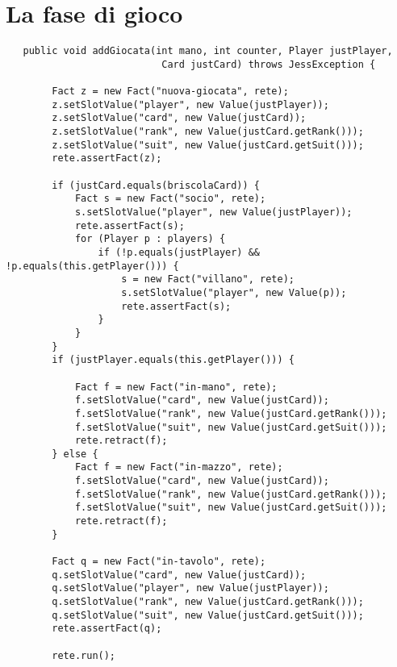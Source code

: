 \section{La fase di gioco}


\lstset{numbers=left, numberstyle=\tiny, stepnumber=1,firstnumber=1,
  numbersep=5pt,language=Java,
stringstyle=\ttfamily,
basicstyle=\footnotesize, 
showstringspaces=false,
breaklines=true
}

\begin{lstlisting}
   public void addGiocata(int mano, int counter, Player justPlayer,
                           Card justCard) throws JessException {

        Fact z = new Fact("nuova-giocata", rete);
        z.setSlotValue("player", new Value(justPlayer));
        z.setSlotValue("card", new Value(justCard));
        z.setSlotValue("rank", new Value(justCard.getRank()));
        z.setSlotValue("suit", new Value(justCard.getSuit()));
        rete.assertFact(z);

        if (justCard.equals(briscolaCard)) {
            Fact s = new Fact("socio", rete);
            s.setSlotValue("player", new Value(justPlayer));
            rete.assertFact(s);
            for (Player p : players) {
                if (!p.equals(justPlayer) && !p.equals(this.getPlayer())) {
                    s = new Fact("villano", rete);
                    s.setSlotValue("player", new Value(p));
                    rete.assertFact(s);
                }
            }
        }
        if (justPlayer.equals(this.getPlayer())) {
        
            Fact f = new Fact("in-mano", rete);
            f.setSlotValue("card", new Value(justCard));
            f.setSlotValue("rank", new Value(justCard.getRank()));
            f.setSlotValue("suit", new Value(justCard.getSuit()));
            rete.retract(f);
        } else {
            Fact f = new Fact("in-mazzo", rete);
            f.setSlotValue("card", new Value(justCard));
            f.setSlotValue("rank", new Value(justCard.getRank()));
            f.setSlotValue("suit", new Value(justCard.getSuit()));
            rete.retract(f);
        }

        Fact q = new Fact("in-tavolo", rete);
        q.setSlotValue("card", new Value(justCard));
        q.setSlotValue("player", new Value(justPlayer));
        q.setSlotValue("rank", new Value(justCard.getRank()));
        q.setSlotValue("suit", new Value(justCard.getSuit()));
        rete.assertFact(q);

        rete.run();

\end{lstlisting}



